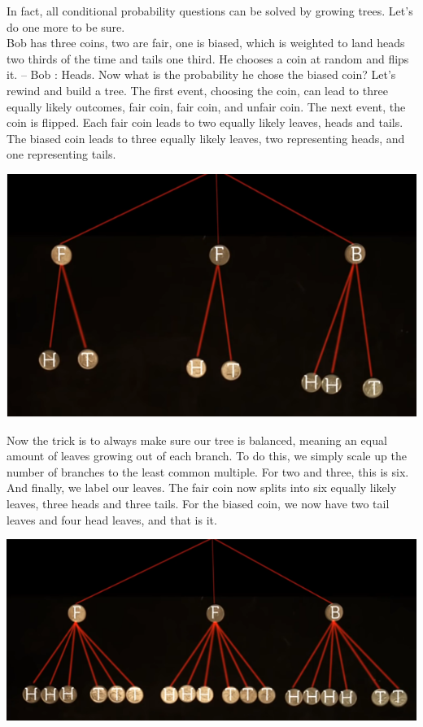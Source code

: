 \documentclass{report}
\begin{document}
In fact, all conditional probability questions can be solved by growing trees. Let's do one more to be sure.\\
Bob has three coins, two are fair, one is biased, which is weighted to land heads two thirds of the time and tails one third. He chooses a coin at random and flips it. – Bob : Heads. Now what is the probability he chose the biased coin? Let's rewind and build a tree. The first event, choosing the coin, can lead to three equally likely outcomes, fair coin, fair coin, and unfair coin. The next event, the coin is flipped. Each fair coin leads to two equally likely leaves, heads and tails. The biased coin leads to three equally likely leaves, two representing heads, and one representing tails. 
 \begin{center}
	\includegraphics[scale=1]{78.png}
\end{center}
Now the trick is to always make sure our tree is balanced, meaning an equal amount of leaves growing out of each branch. To do this, we simply scale up the number of branches to the least common multiple. For two and three, this is six. And finally, we label our leaves. The fair coin now splits into six equally likely leaves, three heads and three tails. For the biased coin, we now have two tail leaves and four head leaves, and that is it.
 \begin{center}
	\includegraphics[scale=1]{79.png}
\end{center}
\end{document}
